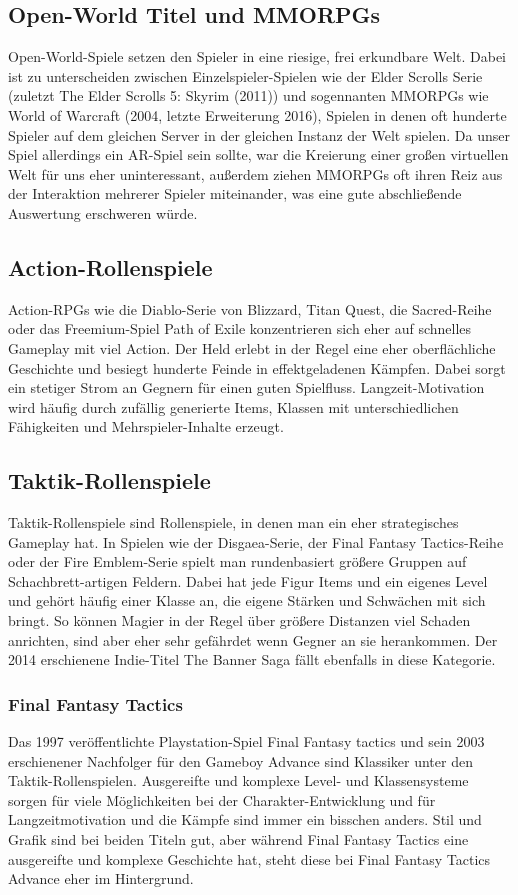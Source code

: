 \documentclass[extern,palatino]{cgBA}
\begin{document}
\subsection{Open-World Titel und MMORPGs}
Open-World-Spiele setzen den Spieler in eine riesige, frei erkundbare Welt. Dabei ist zu unterscheiden zwischen Einzelspieler-Spielen wie der Elder Scrolls Serie (zuletzt The Elder Scrolls 5: Skyrim (2011)) und sogennanten MMORPGs wie World of Warcraft (2004, letzte Erweiterung 2016), Spielen in denen oft hunderte Spieler auf dem gleichen Server in der gleichen Instanz der Welt spielen. Da unser Spiel allerdings ein AR-Spiel sein sollte, war die Kreierung einer großen virtuellen Welt für uns eher uninteressant, außerdem ziehen MMORPGs oft ihren Reiz aus der Interaktion mehrerer Spieler miteinander, was eine gute abschließende Auswertung erschweren würde.
\subsection{Action-Rollenspiele}
Action-RPGs wie die Diablo-Serie von Blizzard, Titan Quest, die Sacred-Reihe oder das Freemium-Spiel Path of Exile konzentrieren sich eher auf schnelles Gameplay mit viel Action. Der Held erlebt in der Regel eine eher oberflächliche Geschichte und besiegt hunderte Feinde in effektgeladenen Kämpfen. Dabei sorgt ein stetiger Strom an Gegnern für einen guten Spielfluss. Langzeit-Motivation wird häufig durch zufällig generierte Items, Klassen mit unterschiedlichen Fähigkeiten und Mehrspieler-Inhalte erzeugt.
\subsection{Taktik-Rollenspiele}
Taktik-Rollenspiele sind Rollenspiele, in denen man ein eher strategisches Gameplay hat. In Spielen wie der Disgaea-Serie, der Final Fantasy Tactics-Reihe oder der Fire Emblem-Serie spielt man rundenbasiert größere Gruppen auf Schachbrett-artigen Feldern. Dabei hat jede Figur Items und ein eigenes Level und gehört häufig einer Klasse an, die eigene Stärken und Schwächen mit sich bringt. So können Magier in der Regel über größere Distanzen viel Schaden anrichten, sind aber eher sehr gefährdet wenn Gegner an sie herankommen. Der 2014 erschienene Indie-Titel The Banner Saga fällt ebenfalls in diese Kategorie.
\subsubsection{Final Fantasy Tactics}
Das 1997 veröffentlichte Playstation-Spiel Final Fantasy tactics und sein 2003 erschienener Nachfolger für den Gameboy Advance sind Klassiker unter den Taktik-Rollenspielen. Ausgereifte und komplexe Level- und Klassensysteme sorgen für viele Möglichkeiten bei der Charakter-Entwicklung und für Langzeitmotivation und die Kämpfe sind immer ein bisschen anders. Stil und Grafik sind bei beiden Titeln gut, aber während Final Fantasy Tactics eine ausgereifte und komplexe Geschichte hat, steht diese bei Final Fantasy Tactics Advance eher im Hintergrund.
\end{document}
